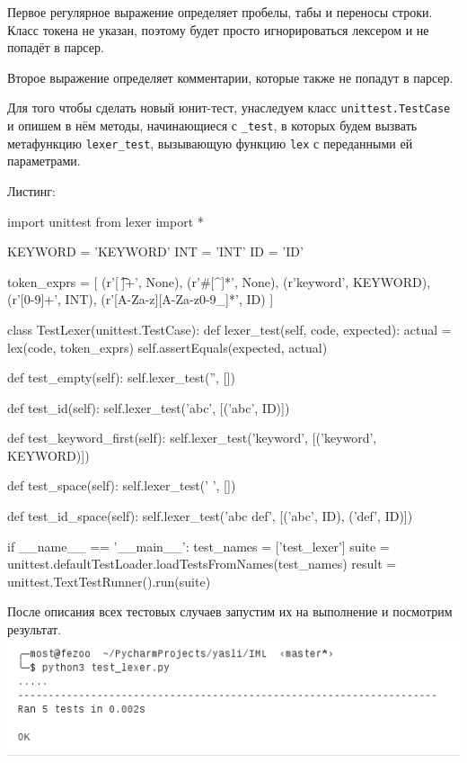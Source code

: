 \documentclass[a4paper,12pt]{article}
\begin{document}
\par Первое регулярное выражение определяет пробелы, табы и переносы строки. Класс токена не указан, поэтому будет просто игнорироваться лексером и не попадёт в парсер.
\par Второе выражение определяет комментарии, которые также не попадут в парсер.

\par Для того чтобы сделать новый юнит-тест, унаследуем класс \verb|unittest.TestCase| и опишем в нём методы, начинающиеся с \verb|_test|, в которых будем вызвать метафункцию \verb|lexer_test|, вызывающую функцию \verb|lex| с переданными ей параметрами.\\

\newpage

Листинг:\\ 
\begin{python}
import unittest
from lexer import *

KEYWORD = 'KEYWORD'
INT = 'INT'
ID = 'ID'

token_exprs = [
    (r'[ \t\n]+', None),
    (r'#[^\n]*', None),
    (r'keyword', KEYWORD),
    (r'[0-9]+', INT),
    (r'[A-Za-z][A-Za-z0-9_]*', ID)
]


class TestLexer(unittest.TestCase):
    def lexer_test(self, code, expected):
        actual = lex(code, token_exprs)
        self.assertEquals(expected, actual)

    def test_empty(self):
        self.lexer_test('', [])

    def test_id(self):
        self.lexer_test('abc', [('abc', ID)])

    def test_keyword_first(self):
        self.lexer_test('keyword', [('keyword', KEYWORD)])

    def test_space(self):
        self.lexer_test(' ', [])

    def test_id_space(self):
        self.lexer_test('abc def', [('abc', ID), ('def', ID)])


if __name__ == '__main__':
    test_names = ['test_lexer']
    suite = unittest.defaultTestLoader.loadTestsFromNames(test_names)
    result = unittest.TextTestRunner().run(suite)
\end{python}

\newpage

\par После описания всех тестовых случаев запустим их на выполнение и посмотрим результат. \\

\includegraphics{passed1.png}
\end{document}

